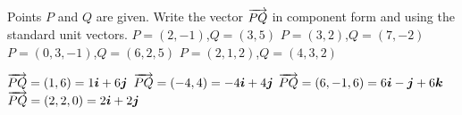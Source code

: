 
\begin{Exercise}[
name={},
title={}, 
difficulty=0,
origin={\cite{GHC}}]
Points $P$ and $Q$ are given. Write the vector $\overrightarrow{PQ}$ in component form and using the standard unit vectors.
\Question $P=(2,-1)$,\quad $Q = (3,5)$
\Question $P=(3,2)$,\quad $Q = (7,-2)$
\Question $P=(0,3,-1)$,\quad $Q = (6,2,5)$
\Question $P=(2,1,2)$,\quad $Q = (4,3,2)$

\end{Exercise}
\begin{Answer}
\Question $\overrightarrow{PQ} = (1,6) = 1\bm{i} + 6\bm{j}$
\Question $\overrightarrow{PQ} = (-4,4) = -4\bm{i} + 4\bm{j}$
\Question $\overrightarrow{PQ} = (6,-1,6) = 6\bm{i} -\bm{j}+6\bm{k}$
\Question $\overrightarrow{PQ} = (2,2,0) = 2\bm{i} +2\bm{j}$
\end{Answer}
